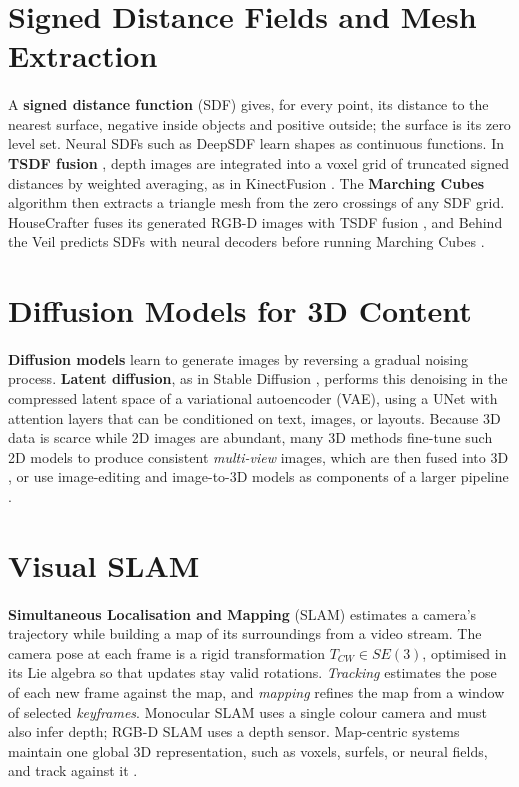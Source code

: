 \documentclass[12pt,a4paper,final]{extreport}
\begin{document}
\section{Signed Distance Fields and Mesh Extraction}

\paragraph{} A \textbf{signed distance function} (SDF) gives, for every point, its distance to the nearest surface, negative inside objects and positive outside; the surface is its zero level set. Neural SDFs such as DeepSDF \cite{park2019} learn shapes as continuous functions. In \textbf{TSDF fusion} \cite{curless1996}, depth images are integrated into a voxel grid of truncated signed distances by weighted averaging, as in KinectFusion \cite{newcombe2011}. The \textbf{Marching Cubes} algorithm \cite{lorensen1987} then extracts a triangle mesh from the zero crossings of any SDF grid. HouseCrafter fuses its generated RGB-D images with TSDF fusion \cite{p2}, and Behind the Veil predicts SDFs with neural decoders before running Marching Cubes \cite{p4}.

\section{Diffusion Models for 3D Content}

\paragraph{} \textbf{Diffusion models} learn to generate images by reversing a gradual noising process. \textbf{Latent diffusion}, as in Stable Diffusion \cite{rombach2022}, performs this denoising in the compressed latent space of a variational autoencoder (VAE), using a UNet with attention layers that can be conditioned on text, images, or layouts. Because 3D data is scarce while 2D images are abundant, many 3D methods fine-tune such 2D models to produce consistent \emph{multi-view} images, which are then fused into 3D \cite{p2}, or use image-editing and image-to-3D models as components of a larger pipeline \cite{p1}.

\section{Visual SLAM}

\paragraph{} \textbf{Simultaneous Localisation and Mapping} (SLAM) estimates a camera's trajectory while building a map of its surroundings from a video stream. The camera pose at each frame is a rigid transformation $T_{CW}\in SE(3)$, optimised in its Lie algebra so that updates stay valid rotations. \emph{Tracking} estimates the pose of each new frame against the map, and \emph{mapping} refines the map from a window of selected \emph{keyframes}. Monocular SLAM uses a single colour camera and must also infer depth; RGB-D SLAM uses a depth sensor. Map-centric systems maintain one global 3D representation, such as voxels, surfels, or neural fields, and track against it \cite{p3}.
\end{document}
